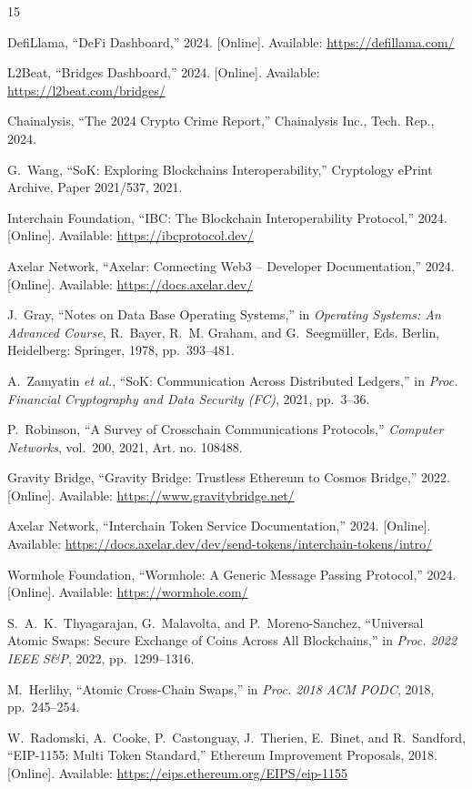 \documentclass[conference,10pt]{IEEEtran}
\begin{document}
\balance

\begin{thebibliography}{15}

DefiLlama, ``DeFi Dashboard,'' 2024. [Online]. Available: \url{https://defillama.com/}

L2Beat, ``Bridges Dashboard,'' 2024. [Online]. Available: \url{https://l2beat.com/bridges/}

Chainalysis, ``The 2024 Crypto Crime Report,'' Chainalysis Inc., Tech. Rep., 2024.

G.~Wang, ``SoK: Exploring Blockchains Interoperability,'' Cryptology ePrint Archive, Paper 2021/537, 2021.

Interchain Foundation, ``IBC: The Blockchain Interoperability Protocol,'' 2024. [Online]. Available: \url{https://ibcprotocol.dev/}

Axelar Network, ``Axelar: Connecting Web3 -- Developer Documentation,'' 2024. [Online]. Available: \url{https://docs.axelar.dev/}

J.~Gray, ``Notes on Data Base Operating Systems,'' in \emph{Operating Systems: An Advanced Course}, R.~Bayer, R.~M. Graham, and G.~Seegm\"{u}ller, Eds. Berlin, Heidelberg: Springer, 1978, pp.~393--481.

A.~Zamyatin \emph{et al.}, ``SoK: Communication Across Distributed Ledgers,'' in \emph{Proc. Financial Cryptography and Data Security (FC)}, 2021, pp.~3--36.

P.~Robinson, ``A Survey of Crosschain Communications Protocols,'' \emph{Computer Networks}, vol.~200, 2021, Art. no. 108488.

Gravity Bridge, ``Gravity Bridge: Trustless Ethereum to Cosmos Bridge,'' 2022. [Online]. Available: \url{https://www.gravitybridge.net/}

Axelar Network, ``Interchain Token Service Documentation,'' 2024. [Online]. Available: \url{https://docs.axelar.dev/dev/send-tokens/interchain-tokens/intro/}

Wormhole Foundation, ``Wormhole: A Generic Message Passing Protocol,'' 2024. [Online]. Available: \url{https://wormhole.com/}

S.~A.~K.~Thyagarajan, G.~Malavolta, and P.~Moreno-Sanchez, ``Universal Atomic Swaps: Secure Exchange of Coins Across All Blockchains,'' in \emph{Proc. 2022 IEEE S\&P}, 2022, pp.~1299--1316.

M.~Herlihy, ``Atomic Cross-Chain Swaps,'' in \emph{Proc. 2018 ACM PODC}, 2018, pp.~245--254.

W.~Radomski, A.~Cooke, P.~Castonguay, J.~Therien, E.~Binet, and R.~Sandford, ``EIP-1155: Multi Token Standard,'' Ethereum Improvement Proposals, 2018. [Online]. Available: \url{https://eips.ethereum.org/EIPS/eip-1155}

\end{thebibliography}
\end{document}
